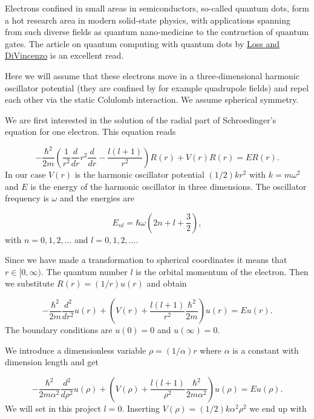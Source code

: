 \documentclass[%
oneside,                 %
final,                   %
10pt]{article}
\begin{document}
Electrons confined in small areas in semiconductors, so-called quantum
dots, form a hot research area in modern solid-state physics, with
applications spanning from such diverse fields as quantum
nano-medicine to the contruction of quantum gates. 
The article on quantum computing with quantum dots by \href{{http://journals.aps.org/pra/abstract/10.1103/PhysRevA.57.120}}{Loss and DiVincenzo} is an excellent read.

Here we will assume that these electrons move in a three-dimensional harmonic
oscillator potential (they are confined by for example quadrupole fields)
and repel  each other via the static Colulomb interaction.  
We assume spherical symmetry.  

We are first interested in the solution of the radial part of Schroedinger's equation for one electron. This equation reads

\begin{equation*}
  -\frac{\hbar^2}{2 m} \left ( \frac{1}{r^2} \frac{d}{dr} r^2
  \frac{d}{dr} - \frac{l (l + 1)}{r^2} \right )R(r) 
     + V(r) R(r) = E R(r).
\end{equation*}
In our case $V(r)$ is the harmonic oscillator potential $(1/2)kr^2$ with
$k=m\omega^2$ and $E$ is
the energy of the harmonic oscillator in three dimensions.
The oscillator frequency is $\omega$ and the energies are

\begin{equation*}
E_{nl}=  \hbar \omega \left(2n+l+\frac{3}{2}\right),
\end{equation*}
with $n=0,1,2,\dots$ and $l=0,1,2,\dots$.

Since we have made a transformation to spherical coordinates it means that 
$r\in [0,\infty)$.  
The quantum number
$l$ is the orbital momentum of the electron.  
% 
Then we substitute $R(r) = (1/r) u(r)$ and obtain
% 

\begin{equation*}
  -\frac{\hbar^2}{2 m} \frac{d^2}{dr^2} u(r) 
       + \left ( V(r) + \frac{l (l + 1)}{r^2}\frac{\hbar^2}{2 m}
                                    \right ) u(r)  = E u(r) .
\end{equation*}
% 
The boundary conditions are $u(0)=0$ and $u(\infty)=0$.

We introduce a dimensionless variable $\rho = (1/\alpha) r$
where $\alpha$ is a constant with dimension length and get
% 

\begin{equation*}
  -\frac{\hbar^2}{2 m \alpha^2} \frac{d^2}{d\rho^2} u(\rho) 
       + \left ( V(\rho) + \frac{l (l + 1)}{\rho^2}
         \frac{\hbar^2}{2 m\alpha^2} \right ) u(\rho)  = E u(\rho) .
\end{equation*}
% 
We will set in this project $l=0$.
Inserting $V(\rho) = (1/2) k \alpha^2\rho^2$ we end up with
\end{document}
